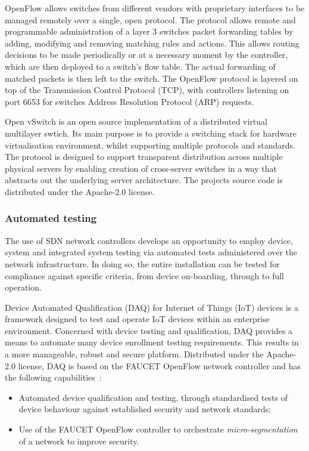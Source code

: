 \documentclass[11pt, oneside]{article}   	%
\begin{document}
OpenFlow allows switches from different vendors with proprietary interfaces to be managed remotely over a single, open protocol.
The protocol allows remote and programmable administration of a layer 3 switches packet forwarding tables by adding, modifying and removing matching rules and actions.
This allows routing decisions to be made periodically or at a necessary moment by the controller, which are then deployed to a switch's flow table.
The actual forwarding of matched packets is then left to the switch.
The OpenFlow protocol is layered on top of the Transmission Control Protocol (TCP), with controllers listening on port 6653 for switches Address Resolution Protocol (ARP) requests.\

Open vSwitch is an open source implementation of a distributed virtual multilayer swtich.
Its main purpose is to provide a switching stack for hardware virtualisation environment, whilst supporting multiple protocols and standards.
The protocol is designed to support transparent distribution across multiple physical servers by enabling creation of cross-server switches in a way that abstracts out the underlying server architecture.
The projects source code is distributed under the Apache-2.0 license.

\subsubsection{Automated testing}
The use of SDN network controllers develops an opportunity to employ device, system and integrated system testing via automated tests administered over the network infrastructure.
In doing so, the entire installation can be tested for compliance against specific criteria, from device on-boarding, through to full operation.

Device Automated Qualification (DAQ) for Internet of Things (IoT) devices is a framework designed to test and operate IoT devices within an enterprise environment.
Concerned with device testing and qualification, DAQ provides a means to automate many device enrollment testing requirements.
This results in a more manageable, robust and secure platform.
Distributed under the Apache-2.0 license, DAQ is based on the FAUCET OpenFlow network controller and has the following capabilities~\cite{daq1}:
\begin{itemize}
	\item Automated device qualification and testing, through standardised tests of device behaviour against established security and network standards; 
	\item Use of the FAUCET OpenFlow controller to orchestrate \emph{micro-segmentation} of a network to improve security.
\end{itemize}\
\end{document}
